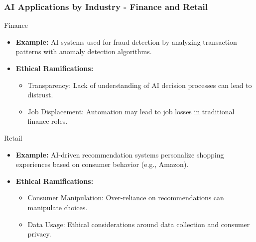 \documentclass[aspectratio=169]{beamer}
\begin{document}
\begin{frame}[fragile]
    \frametitle{AI Applications by Industry - Finance and Retail}
    \begin{block}{Finance}
        \begin{itemize}
            \item \textbf{Example:} AI systems used for fraud detection by analyzing transaction patterns with anomaly detection algorithms.
            \item \textbf{Ethical Ramifications:}
            \begin{itemize}
                \item Transparency: Lack of understanding of AI decision processes can lead to distrust.
                \item Job Displacement: Automation may lead to job losses in traditional finance roles.
            \end{itemize}
        \end{itemize}
    \end{block}
    
    \begin{block}{Retail}
        \begin{itemize}
            \item \textbf{Example:} AI-driven recommendation systems personalize shopping experiences based on consumer behavior (e.g., Amazon).
            \item \textbf{Ethical Ramifications:}
            \begin{itemize}
                \item Consumer Manipulation: Over-reliance on recommendations can manipulate choices.
                \item Data Usage: Ethical considerations around data collection and consumer privacy.
            \end{itemize}
        \end{itemize}
    \end{block}
\end{frame}
\end{document}
